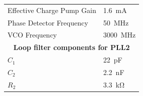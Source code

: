 \begin{table}[tbh]
\begin{tabularx}{\textwidth}{Xl}
		Effective Charge Pump Gain                                                & \SI{1.6}{\milli\ampere}  \\
		Phase Detector Frequency                                                  & \SI{50}{\MHz}            \\
		VCO Frequency                                                             & \SI{3000}{\MHz}          \\
		[0.3cm]
	    \multicolumn{2}{c}{\textbf{Loop filter components for PLL2}}   \\
		$C_{1}$                                                                   & \SI{22}{\pico\farad}     \\
		$C_{2}$                                                                   & \SI{2.2}{\nano\farad}    \\
		$R_{2}$                                                                   & \SI{3.3}{\kilo\ohm}      \\ \bottomrule
	\end{tabularx}
\end{table}

